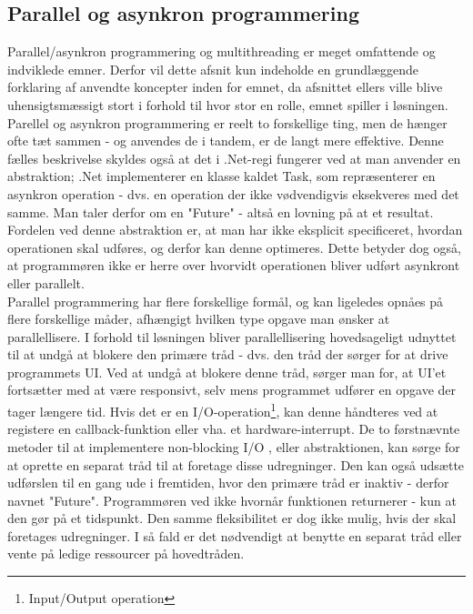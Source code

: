 \subsection{Parallel og asynkron programmering}
\label{subsec:pprogrammering}
Parallel/asynkron programmering og multithreading er meget omfattende og indviklede emner. Derfor vil dette afsnit kun indeholde en grundlæggende forklaring af anvendte koncepter inden for emnet, da afsnittet ellers ville blive uhensigtsmæssigt stort i forhold til hvor stor en rolle, emnet spiller i løsningen.\\

Parellel og asynkron programmering er reelt to forskellige ting, men de hænger ofte tæt sammen - og anvendes de i tandem, er de langt mere effektive. Denne fælles beskrivelse skyldes også at det i .Net-regi fungerer ved at man anvender en abstraktion; .Net implementerer en klasse kaldet Task, som repræsenterer en asynkron operation - dvs. en operation der ikke vødvendigvis eksekveres med det samme. Man taler derfor om en "Future" - altså en lovning på at et resultat. Fordelen ved denne abstraktion er, at man har ikke eksplicit specificeret, hvordan operationen skal udføres, og derfor kan denne optimeres. Dette betyder dog også, at programmøren ikke er herre over hvorvidt operationen bliver udført asynkront eller parallelt.\\

Parallel programmering har flere forskellige formål, og kan ligeledes opnåes på flere forskellige måder, afhængigt hvilken type opgave man ønsker at parallellisere\cite{accuthreading}. I forhold til løsningen bliver parallellisering hovedsageligt udnyttet til at undgå at blokere den primære tråd - dvs. den tråd der sørger for at drive programmets UI. Ved at undgå at blokere denne tråd, sørger man for, at UI'et fortsætter med at være responsivt, selv mens programmet udfører en opgave der tager længere tid. Hvis det er en I/O-operation\footnote{Input/Output operation}, kan denne håndteres ved at registere en callback-funktion \cite{callback} eller vha. et hardware-interrupt\cite{hwinterrupt1}\cite{hwinterrupt2}. De to førstnævnte metoder til at implementere non-blocking I/O \cite{accuthreading}, eller abstraktionen, kan sørge for at oprette en separat tråd til at foretage disse udregninger. Den kan også udsætte udførslen til en gang ude i fremtiden, hvor den primære tråd er inaktiv - derfor navnet "Future"\mbox{}. Programmøren ved ikke hvornår funktionen returnerer - kun at den gør på et tidspunkt. Den samme fleksibilitet er dog ikke mulig, hvis der skal foretages udregninger. I så fald er det nødvendigt at benytte en separat tråd eller vente på ledige ressourcer på hovedtråden.

